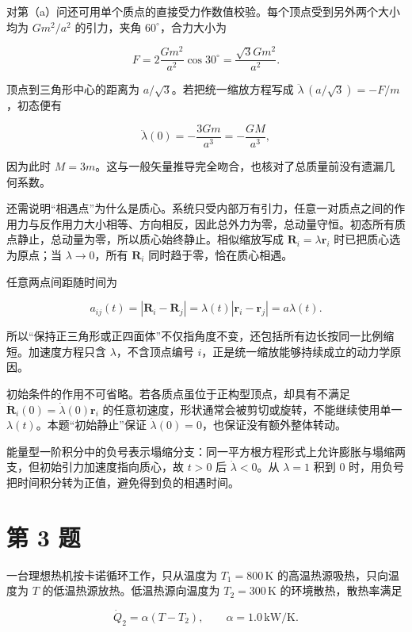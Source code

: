 \documentclass[12pt,a4paper,UTF8]{ctexart}
\begin{document}
对第（a）问还可用单个质点的直接受力作数值校验。每个顶点受到另外两个大小均为
\(Gm^2/a^2\) 的引力，夹角 \(60^\circ\)，合力大小为

\[
F=2\frac{Gm^2}{a^2}\cos30^\circ
=\frac{\sqrt3Gm^2}{a^2}. \tag{33}
\]

顶点到三角形中心的距离为 \(a/\sqrt3\)。若把统一缩放方程写成
\(\ddot\lambda\,(a/\sqrt3)=-F/m\)，初态便有

\[
\ddot\lambda(0)=-\frac{3Gm}{a^3}=-\frac{GM}{a^3},
\]

因为此时
\(M=3m\)。这与一般矢量推导完全吻合，也核对了总质量前没有遗漏几何系数。

还需说明``相遇点''为什么是质心。系统只受内部万有引力，任意一对质点之间的作用力与反作用力大小相等、方向相反，因此总外力为零，总动量守恒。初态所有质点静止，总动量为零，所以质心始终静止。相似缩放写成
\(\boldsymbol R_i=\lambda\boldsymbol r_i\) 时已把质心选为原点；当
\(\lambda\to0\)，所有 \(\boldsymbol R_i\) 同时趋于零，恰在质心相遇。

任意两点间距随时间为

\[
a_{ij}(t)=|\boldsymbol R_i-\boldsymbol R_j|
=\lambda(t)|\boldsymbol r_i-\boldsymbol r_j|
=a\lambda(t).
\]

所以``保持正三角形或正四面体''不仅指角度不变，还包括所有边长按同一比例缩短。加速度方程只含
\(\lambda\)，不含顶点编号 \(i\)，正是统一缩放能够持续成立的动力学原因。

初始条件的作用不可省略。若各质点虽位于正构型顶点，却具有不满足
\(\dot{\boldsymbol R}_i(0)=\dot\lambda(0)\boldsymbol r_i\)
的任意初速度，形状通常会被剪切或旋转，不能继续使用单一
\(\lambda(t)\)。本题``初始静止''保证
\(\dot\lambda(0)=0\)，也保证没有额外整体转动。

能量型一阶积分中的负号表示塌缩分支：同一平方根方程形式上允许膨胀与塌缩两支，但初始引力加速度指向质心，故
\(t>0\) 后 \(\dot\lambda<0\)。从 \(\lambda=1\) 积到 \(0\)
时，用负号把时间积分转为正值，避免得到负的相遇时间。

\newpage

\section{第 3 题}\label{ux7b2c-3-ux9898}

一台理想热机按卡诺循环工作，只从温度为 \(T_1=800\,\mathrm K\)
的高温热源吸热，只向温度为 \(T\) 的低温热源放热。低温热源向温度为
\(T_2=300\,\mathrm K\) 的环境散热，散热率满足

\[
\dot Q_2=\alpha(T-T_2),
\qquad
\alpha=1.0\,\mathrm{kW/K}.
\]
\end{document}

